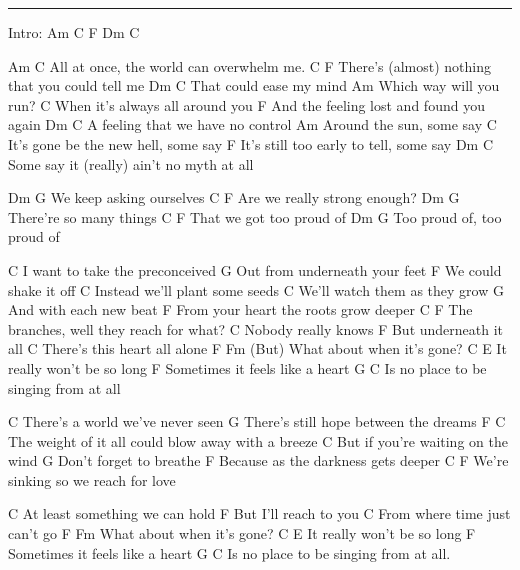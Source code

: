 \noindent\rule{\columnwidth}{1pt}
\begin{multicols}{2}
\begin{lstsong}
Intro: Am C F Dm C

       Am                      C
All at once, the world can overwhelm me.
                 C                      F
There's (almost) nothing that you could tell me
           Dm      C
That could ease my mind
                   Am
Which way will you run?
                       C
When it's always all around you
                         F
And the feeling lost and found you again
                  Dm      C
A feeling that we have no control
           Am
Around the sun, some say
                      C
It's gone be the new hell, some say
                         F
It's still too early to tell, some say
                              Dm       C
Some say it (really) ain't no myth at all

Dm                  G
  We keep asking ourselves
              C      F
Are we really strong enough?
Dm                 G
  There're so many things
            C            F
That we got    too proud of
          Dm            G
Too proud of, too proud of

          C
I want to take the preconceived
           G
Out from underneath your feet
         F
We could shake it off
              C
Instead we'll plant some seeds
      C
We'll watch them as they grow
          G
And with each new beat
            F
From your heart the roots grow deeper
    C                             F
The branches, well they reach for what?
              C
Nobody really knows
F
    But underneath it all
                       C
There's this heart all alone
F                              Fm
    (But) What about when it's gone?
C                     E
It really won't be so long
             F
Sometimes it feels like a heart
      G                           C
Is no place to be singing from at all

          C
There's a world we've never seen
               G
There's still hope between the dreams
      F                          C
The weight of it all could blow away with a breeze
              C
But if you're waiting on the wind
G
Don't forget to breathe
               F
Because as the darkness gets deeper
      C                       F
We're sinking so we reach for love

                          C
At least something we can hold
F
    But I'll reach to you
                           C
From where time just can't go
F                        Fm
    What about when it's gone?
C                     E
It really won't be so long
             F
Sometimes it feels like a heart
      G                           C
Is no place to be singing from at all.
\end{lstsong}
\end{multicols}
\newpage

